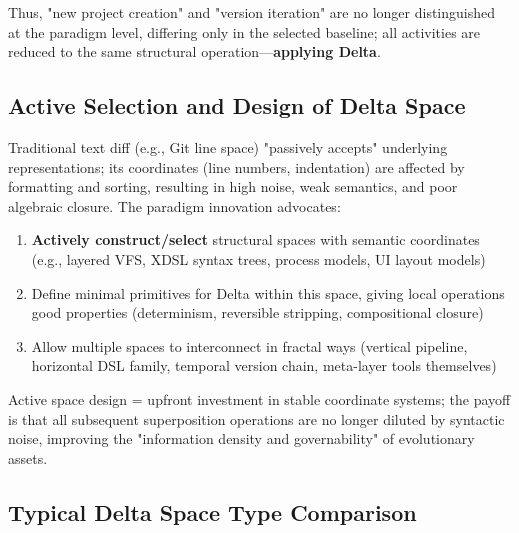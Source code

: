 \documentclass[11pt]{article}
\begin{document}
Thus, "new project creation" and "version iteration" are no longer distinguished at the paradigm level, differing only in the selected baseline; all activities are reduced to the same structural operation—\textbf{applying Delta}.

\subsection{Active Selection and Design of Delta Space}

Traditional text diff (e.g., Git line space) "passively accepts" underlying representations; its coordinates (line numbers, indentation) are affected by formatting and sorting, resulting in high noise, weak semantics, and poor algebraic closure. The paradigm innovation advocates:

\begin{enumerate}
\item \textbf{Actively construct/select} structural spaces with semantic coordinates (e.g., layered VFS, XDSL syntax trees, process models, UI layout models)
\item Define minimal primitives for Delta within this space, giving local operations good properties (determinism, reversible stripping, compositional closure)
\item Allow multiple spaces to interconnect in fractal ways (vertical pipeline, horizontal DSL family, temporal version chain, meta-layer tools themselves)
\end{enumerate}

Active space design = upfront investment in stable coordinate systems; the payoff is that all subsequent superposition operations are no longer diluted by syntactic noise, improving the "information density and governability" of evolutionary assets.

\subsection{Typical Delta Space Type Comparison}
\end{document}
